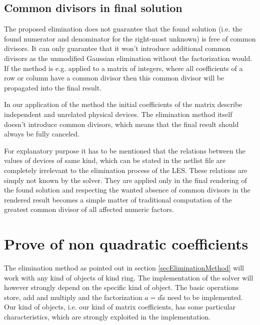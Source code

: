\subsection{Common divisors in final solution}

The proposed elimination does not guarantee that the found solution (i.e.
the found numerator and denominator for the right-most unknown) is free of
common divisors. It can only guarantee that it won't introduce additional
common divisors as the unmodified Gaussian elimination without the
factorization would. If the method is e.g. applied to a matrix of
integers, where all coefficients of a row or column have a common divisor
then this common divisor will be propagated into the final result.


In our application of the method the initial coefficients of the matrix
describe independent and unrelated physical devices. The elimination
method itself doesn't introduce common divisors, which means that the
final result should always be fully canceled.

For explanatory purpose it has to be mentioned that the relations between
the values of devices of same kind, which can be stated in the netlist
file are completely irrelevant to the elimination process of the LES.
These relations are simply not known by the solver. They are applied only
in the final rendering of the found solution and respecting the wanted
absence of common divisors in the rendered result becomes a simple matter
of traditional computation of the greatest common divisor of all affected
numeric factors.


\section{Prove of non quadratic coefficients}
\label{secProveOfNonQuadraticCoef}

The elimination method as pointed out in section
\ref{secEliminationMethod} will work with any kind of objects of kind
ring. The implementation of the solver will however strongly depend on the
specific kind of object. The basic operations store, add and multiply and
the factorization $a = d \tilde a$ need to be implemented. Our kind of
objects, i.e. our kind of matrix coefficients, has some particular
characteristics, which are strongly exploited in the implementation.

